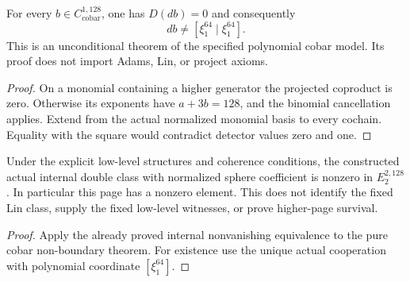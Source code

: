 \begin{theorem}
  \label{thm:h6-square-cobar-nonboundary}
  \leanok
  For every $b\in C^{1,128}_{\mathrm{cobar}}$, one has
  $D(db)=0$ and consequently
  \[
    db\ne[\xi_1^{64}\mid\xi_1^{64}].
  \]
  This is an unconditional theorem of the specified polynomial cobar
  model. Its proof does not import Adams, Lin, or project axioms.
\end{theorem}
\begin{proof}
  On a monomial containing a higher generator the projected coproduct
  is zero. Otherwise its exponents have $a+3b=128$, and the binomial
  cancellation applies. Extend from the actual normalized monomial basis
  to every cochain. Equality with the square would contradict detector
  values zero and one.
  \leanok
\end{proof}

\begin{proposition}
  \label{prop:h6-double-internal-nonzero}
  \leanok
  Under the explicit low-level structures and coherence conditions, the
  constructed actual internal double class with normalized sphere
  coefficient is nonzero in $E_2^{2,128}$. In particular this page has
  a nonzero element. This does not identify the fixed Lin class, supply
  the fixed low-level witnesses, or prove higher-page survival.
\end{proposition}
\begin{proof}
  Apply the already proved internal nonvanishing equivalence to the
  pure cobar non-boundary theorem. For existence use the unique actual
  cooperation with polynomial coordinate $[\xi_1^{64}]$.
  \leanok
\end{proof}

